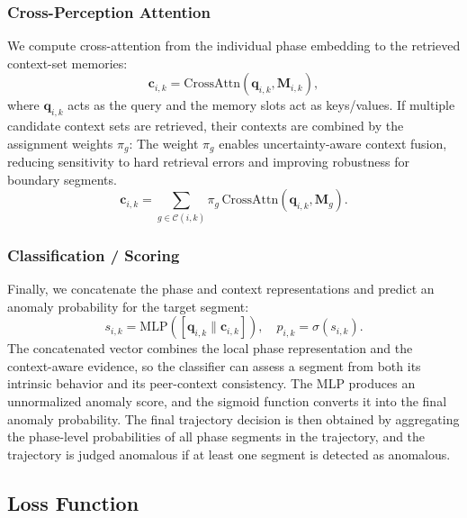 \documentclass[iicol,pdflatex,sn-basic,Numbered]{sn-jnl}%
\theoremstyle{thmstyleone}%
\theoremstyle{thmstyletwo}%
\theoremstyle{thmstylethree}%
\begin{document}
\subsubsection{Cross-Perception Attention}

We compute cross-attention from the individual phase embedding to the retrieved context-set memories:
\begin{equation}
\label{eq:cross_perception}
\mathbf{c}_{i,k} = \text{CrossAttn}(\mathbf{q}_{i,k}, \mathbf{M}_{i,k}),
\end{equation}
where $\mathbf{q}_{i,k}$ acts as the query and the memory slots act as keys/values.
If multiple candidate context sets are retrieved, their contexts are combined by the assignment weights $\pi_g$:
The weight $\pi_g$ enables uncertainty-aware context fusion, reducing sensitivity to hard retrieval errors and improving robustness for boundary segments.
\begin{equation}
\mathbf{c}_{i,k} = \sum_{g\in\mathcal{C}(i,k)} \pi_g\, \text{CrossAttn}(\mathbf{q}_{i,k}, \mathbf{M}_{g}).
\end{equation}

\subsubsection{Classification / Scoring}

Finally, we concatenate the phase and context representations and predict an anomaly probability for the target segment:
\begin{equation}
\label{eq:segment_score}
s_{i,k} = \text{MLP}([\mathbf{q}_{i,k} \| \mathbf{c}_{i,k}]), \quad p_{i,k} = \sigma(s_{i,k}).
\end{equation}
The concatenated vector combines the local phase representation and the context-aware evidence, so the classifier can assess a segment from both its intrinsic behavior and its peer-context consistency.
The MLP produces an unnormalized anomaly score, and the sigmoid function converts it into the final anomaly probability.
The final trajectory decision is then obtained by aggregating the phase-level probabilities of all phase segments in the trajectory, and the trajectory is judged anomalous if at least one segment is detected as anomalous.

\subsection{Loss Function}
\end{document}
